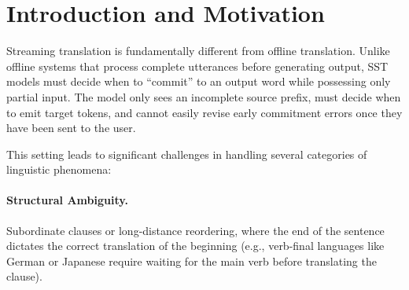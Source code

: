 \begin{abstract}
Streaming speech translation (SST) requires models to generate translations in real-time as audio arrives, creating a fundamental tension between translation quality and latency. Current simultaneous translation methods (e.g., wait-$k$ \citep{ma2019stacl} or fixed commit strategies) often suffer from ``early commitment'' errors---making a final translation decision before sufficient context is available---which cannot be easily corrected in a real-time streaming pipeline. We propose \textbf{Selective Test-Time Reasoning}, a method that triggers extra refinement steps only when the model identifies high uncertainty in its own predictions. Instead of always adding extra inference steps, we activate lightweight refinement only on difficult or ambiguous prefixes, thereby spending additional compute exclusively where it is needed. Our goal is to improve the quality--latency tradeoff by comparing multi-candidate selection, draft-then-refine, and uncertainty-triggered refinement against strong streaming baselines. We evaluate their impact on BLEU and latency-aware metrics (Average Lagging, LAAL) on standard benchmarks including MuST-C \citep{digangi2019mustc} and CoVoST2 \citep{wang2021covost2}.
\end{abstract}

\section{Introduction and Motivation}

Streaming translation is fundamentally different from offline translation. Unlike offline systems that process complete utterances before generating output, SST models must decide when to ``commit'' to an output word while possessing only partial input. The model only sees an incomplete source prefix, must decide when to emit target tokens, and cannot easily revise early commitment errors once they have been sent to the user.

This setting leads to significant challenges in handling several categories of linguistic phenomena:

\paragraph{Structural Ambiguity.} Subordinate clauses or long-distance reordering, where the end of the sentence dictates the correct translation of the beginning (e.g., verb-final languages like German or Japanese require waiting for the main verb before translating the clause).

